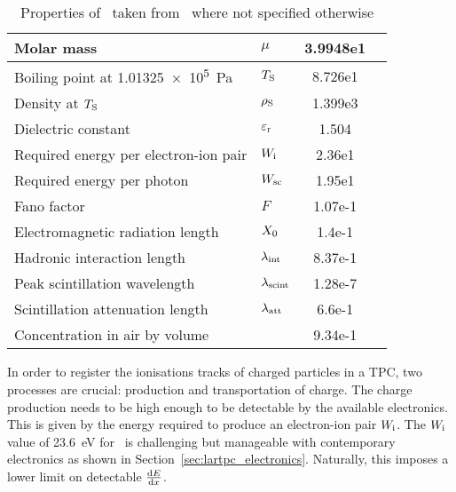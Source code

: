 \begin{table}[htb]
	\centering
	\caption{Properties of \lar\ taken from~\cite{NobleGasDetectors} where not specified otherwise}
	\label{tab:lartpc_larprop}
	\begin{tabu} to \textwidth {|ll|Ss|}
		\hline
		{Molar mass} &									$\mu$ &					3.9948e1 &	\gram\per\mol \\
		\hline
		{Boiling point at} \SI{1.01325e5}{\pascal} &	$T_{\mathrm{S}}$ &			8.726e1 &	\kelvin \\
		\hline
		{Density at} $T_{\mathrm{S}}$ &						$\rho_{\mathrm{S}}$ &		1.399e3 &	\kilo\gram\per\cubic\metre \\
		\hline
		{Dielectric constant~\cite{dielConst}} &		$\varepsilon_{\mathrm{r}}$ &	1.504 &		\\
		\hline
		{Required energy per electron-ion pair} &		$W_{\mathrm{i}}$ &			2.36e1 &	\electronvolt \\
		\hline
		{Required energy per photon} &					$W_{\mathrm{sc}}$ &			1.95e1 &	\electronvolt \\
		\hline
		{Fano factor} &									$F$ &					1.07e-1 &	\\
		\hline
		{Electromagnetic radiation length} &			$X_{\mathrm{0}}$ &			1.4e-1 &	\metre \\
		\hline
		{Hadronic interaction length} &					$\lambda_{\mathrm{int}}$ &	8.37e-1 &	\metre \\
		\hline
		{Peak scintillation wavelength} &				$\lambda_{\mathrm{scint}}$ &	1.28e-7 &	\metre \\
		\hline
		{Scintillation attenuation length} &			$\lambda_{\mathrm{att}}$ &	6.6e-1 &	\metre \\
		\hline
		{Concentration in air by volume} &				&						9.34e-1 &	\percent \\
		\hline
	\end{tabu}
\end{table}

In order to register the ionisations tracks of charged particles in a TPC, two processes are crucial: production and transportation of charge.
The charge production needs to be high enough to be detectable by the available electronics.
This is given by the energy required to produce an electron-ion pair $W_{\mathrm{i}}$.
The $W_{\mathrm{i}}$ value of \SI{23.6}{\electronvolt} for \lar\ is challenging but manageable with contemporary electronics as shown in Section~\ref{sec:lartpc_electronics}.
Naturally, this imposes a lower limit on detectable $\frac{\mathrm{d}E}{\mathrm{d}x}$.

